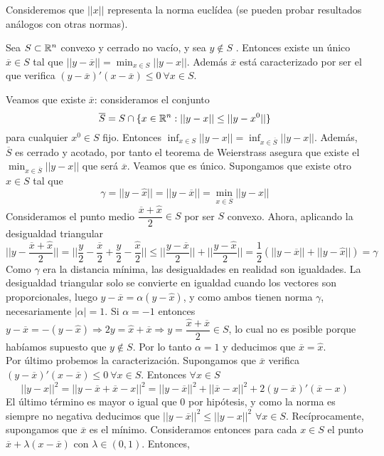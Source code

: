 \documentclass[PM.tex]{subfiles}
\begin{document}
Consideremos que $||x||$ representa la norma euclídea (se pueden probar resultados análogos con otras normas). 
\begin{theorem}
Sea $S\subset\mathbb{R}^n$ convexo y cerrado no vacío, y sea $y\not\in S$ . Entonces existe un único $\overline{x}\in S$ tal que $||y-\overline{x}||=\min_{x\in S}||y-x||$. Además $\overline{x}$ está caracterizado por ser el que verifica $(y-\overline{x})'(x-\overline{x})\leq 0\ \forall x\in S$.

\end{theorem}
\begin{dem}
Veamos que existe $\overline{x}$: consideramos el conjunto \[ \overline{S}=S\cap\{x\in\mathbb{R}^n : ||y-x||\leq ||y-x^0||\}\] para cualquier $x^0\in S$ fijo. Entonces $\inf_{x\in S}||y-x||=\inf_{x\in\overline{S}}||y-x||$. Además, $\overline{S}$ es cerrado y acotado, por tanto el teorema de Weierstrass asegura que existe el $\min_{x\in\overline{S}}||y-x||$ que será $\overline{x}$. Veamos que es único. Supongamos que existe otro $\hat{x}\in S$ tal que 
\[
\gamma=||y-\hat{x}||=||y-\overline{x}||=\min_{x\in\overline{S}}||y-x||
\]
Consideramos el punto medio $\dfrac{\overline{x}+\hat{x}}{2}\in S$ por ser $S$ convexo. Ahora, aplicando la desigualdad triangular
\[
|| y-\frac{\overline{x}+\hat{x}}{2}||=||\frac{y}{2}-\frac{\overline{x}}{2}+\frac{y}{2}-\frac{\hat{x}}{2}||\leq ||\frac{y-\overline{x}}{2}||+||\frac{y-\hat{x}}{2}||=\frac{1}{2}\left(||y-\overline{x}||+||y-\hat{x}||\right)=\gamma
\]
Como $\gamma$ era la distancia mínima, las desigualdades en realidad son igualdades. La desigualdad triangular solo se convierte en igualdad cuando los vectores son proporcionales, luego $y-\overline{x}=\alpha(y-\hat{x})$, y como ambos tienen norma $\gamma$, necesariamente $|\alpha|=1$. Si $\alpha=-1$ entonces $y-\overline{x}=-(y-\hat{x})\Rightarrow 2y=\hat{x}+\overline{x}\Rightarrow y=\dfrac{\hat{x}+\overline{x}}{2}\in S$, lo cual no es posible porque habíamos supuesto que $y\not\in S$. Por lo tanto $\alpha=1$ y deducimos que $\overline{x}=\hat{x}$.\\
Por último probemos la caracterización. Supongamos que $\overline{x}$ verifica $(y-\overline{x})'(x-\overline{x})\leq 0\ \forall x\in S$. Entonces $\forall x\in S$
\[
||y-x||^2=||y-\overline{x}+\overline{x}-x||^2=||y-\overline{x}||^2+||\overline{x}-x||^2+2(y-\overline{x})'(\overline{x}-x)
\]
El último término es mayor o igual que $0$ por hipótesis, y como la norma es siempre no negativa deducimos que $ ||y-\overline{x}||^2 \leq ||y-x||^2$ $\forall x\in S$. Recíprocamente, supongamos que $\overline{x}$ es el mínimo.  Consideramos entonces para cada $x\in S$ el punto $\overline{x}+\lambda(x-\overline{x})$ con $\lambda\in (0,1)$. Entonces, 

\end{dem}
\end{document}
